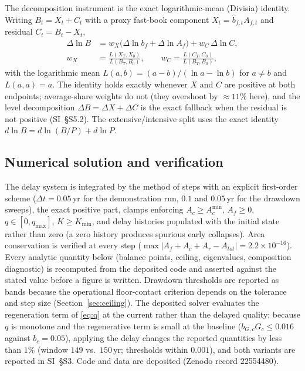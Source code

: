 \documentclass[preprint,12pt,authoryear]{elsarticle}
\newcommand{\Acmin}{A_c^{\min}}
\begin{document}
The decomposition instrument is the exact logarithmic-mean (Divisia) identity. Writing $B_t=X_t+C_t$ with a proxy fast-book component $X_t=\hat b_{f,t}A_{f,t}$ and residual $C_t=B_t-X_t$,
\begin{equation}\label{eq:divisia}
\begin{split}
\Delta\ln B&=w_X\big(\Delta\ln b_f+\Delta\ln A_f\big)+w_C\,\Delta\ln C,\\
w_X&=\frac{L(X_T,X_0)}{L(B_T,B_0)},\qquad w_C=\frac{L(C_T,C_0)}{L(B_T,B_0)},
\end{split}
\end{equation}
with the logarithmic mean $L(a,b)=(a-b)/(\ln a-\ln b)$ for $a\neq b$ and $L(a,a)=a$. The identity holds exactly whenever $X$ and $C$ are positive at both endpoints; average-share weights do not (they overshoot by $\approx11\%$ here), and the level decomposition $\Delta B=\Delta X+\Delta C$ is the exact fallback when the residual is not positive (SI~\S S5.2). The extensive/intensive split uses the exact identity $d\ln B=d\ln(B/P)+d\ln P$.

\subsection{Numerical solution and verification}\label{sec:numerics}

The delay system is integrated by the method of steps with an explicit first-order scheme ($\Delta t=0.05$\,yr for the demonstration run, $0.1$ and $0.05$\,yr for the drawdown sweeps), the exact positive part, clamps enforcing $A_c\ge\Acmin$, $A_f\ge0$, $q\in[0,q_{\max}]$, $K\ge K_{\min}$, and delay histories populated with the initial state rather than zero (a zero history produces spurious early collapses). Area conservation is verified at every step ($\max|A_f+A_c+A_r-A_{tot}|=2.2\times10^{-16}$). Every analytic quantity below (balance points, ceiling, eigenvalues, composition diagnostic) is recomputed from the deposited code and asserted against the stated value before a figure is written. Drawdown thresholds are reported as bands because the operational floor-contact criterion depends on the tolerance and step size (Section~\ref{sec:ceiling}). The deposited solver evaluates the regeneration term of \eqref{eq:q} at the current rather than the delayed quality; because $q$ is monotone and the regenerative term is small at the baseline ($b_{G,c}G_c\le0.016$ against $b_c=0.05$), applying the delay changes the reported quantities by less than $1\%$ (window $149$ vs.\ $150$\,yr; thresholds within $0.001$), and both variants are reported in SI~\S S3. Code and data are deposited (Zenodo record 22554480).
\end{document}
